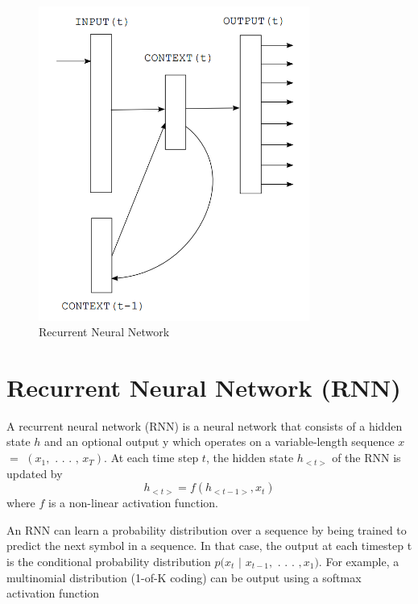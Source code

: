 \documentclass[12pt]{report}
\begin{document}
\begin{figure}
\centering
\includegraphics[width=3.5in]{simple_rnn.png}
\caption{Recurrent Neural Network}
\label{simple_rnn}
\end{figure}

\section{Recurrent Neural Network (RNN)}


A recurrent neural network (RNN) is a neural network
that consists of a hidden state $h$ and an
optional output y which operates on a variable-length
sequence $x$ $=$ $(x_{1},\text{ . . . , }x_{T} )$. At each time
step $t$, the hidden state $h_{<t>}$ of the RNN is updated
by
\begin{equation}
h_{<t>} = f \left( h_{<t-1>}, x_{t} \right)
\end{equation}
where $f$ is a non-linear activation function.

An RNN can learn a probability distribution
over a sequence by being trained to predict the
next symbol in a sequence. In that case, the output
at each timestep t is the conditional probability distribution
$p( x_{t}$ $|$ $x_{t−1},\text{ . . . }, x_{1})$. For example, a multinomial
distribution (1-of-K coding) can be output using a
softmax activation function
\end{document}
